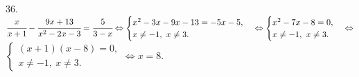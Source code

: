 36. $\cfrac{x}{x+1}-\cfrac{9x+13}{x^2-2x-3}=\cfrac{5}{3-x}\Leftrightarrow \begin{cases} x^2-3x-9x-13=-5x-5,\\ x\neq-1,\ x\neq3.\end{cases}
\Leftrightarrow \begin{cases} x^2-7x-8=0,\\ x\neq-1,\ x\neq3.\end{cases}
\Leftrightarrow$\\$\begin{cases} (x+1)(x-8)=0,\\ x\neq-1,\ x\neq3.\end{cases}\Leftrightarrow x=8.$\\
